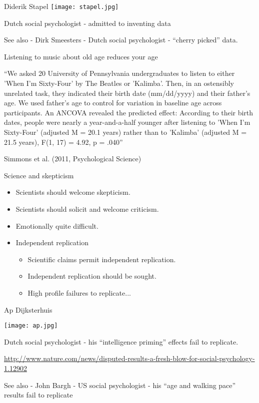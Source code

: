 \documentclass{beamer}
\begin{document}
\begin{frame}{Diderik Stapel}
	\texttt{[image: stapel.jpg]}

	Dutch social psychologist - admitted to inventing data
	
	See also - Dirk Smeesters - Dutch social psychologist - ``cherry picked'' data.
	
\end{frame}

\begin{frame}{Listening to music about old age reduces your age}
	
	``We asked 20 University of Pennsylvania undergraduates to listen to either 'When I’m Sixty-Four' by The Beatles or 'Kalimba'. Then, in an ostensibly unrelated task, they indicated their birth date (mm/dd/yyyy) and their father’s age. We used father’s age to control for variation in baseline age across participants. An ANCOVA revealed the predicted effect: According to their birth dates, people were nearly a year-and-a-half younger after listening to 'When I’m Sixty-Four' (adjusted M = 20.1 years) rather than to 'Kalimba' (adjusted M = 21.5 years), F(1, 17) = 4.92, p = .040''
	
	\vspace{12 pt}
	
	Simmons et al. (2011, Psychological Science)
	
\end{frame}

\begin{frame}{Science and skepticism}
	\begin{itemize}
		\item Scientists should welcome skepticism.
		\item Scientists should solicit and welcome criticism.
		\item Emotionally quite difficult.
		\item Independent replication
		\begin{itemize}
			\item Scientific claims permit independent replication.
			\item Independent replication should be sought.
			\item High profile failures to replicate...
		\end{itemize}
	\end{itemize}
\end{frame}

\begin{frame}{Ap Dijksterhuis}
	\centerline{\texttt{[image: ap.jpg]}}

	Dutch social psychologist - his ``intelligence priming'' effects fail to replicate. 
	
	\url{http://www.nature.com/news/disputed-results-a-fresh-blow-for-social-psychology-1.12902}
	
	See also - John Bargh - US social psychologist - his ``age and walking pace'' results fail to replicate
	
\end{frame}
\end{document}
